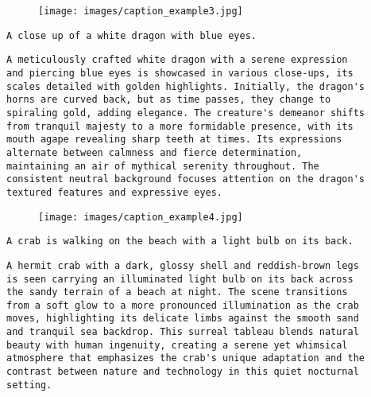 \documentclass{article} \usepackage{iclr2024_conference,times}
\begin{document}
{\begin{figure}[h]
\begin{center}
\texttt{[image: images/caption\_example3.jpg]}
\end{center}
\end{figure} \begin{promptbox}
\begin{verbatim}
A close up of a white dragon with blue eyes.
\end{verbatim}
\end{promptbox}
\begin{promptbox}
\begin{verbatim}
A meticulously crafted white dragon with a serene expression 
and piercing blue eyes is showcased in various close-ups, its 
scales detailed with golden highlights. Initially, the dragon's
horns are curved back, but as time passes, they change to 
spiraling gold, adding elegance. The creature's demeanor shifts 
from tranquil majesty to a more formidable presence, with its 
mouth agape revealing sharp teeth at times. Its expressions 
alternate between calmness and fierce determination, 
maintaining an air of mythical serenity throughout. The 
consistent neutral background focuses attention on the dragon's
textured features and expressive eyes.
\end{verbatim}
\end{promptbox}


\begin{figure}[h]
\begin{center}
\texttt{[image: images/caption\_example4.jpg]}
\end{center}
\end{figure} \begin{promptbox}
\begin{verbatim}
A crab is walking on the beach with a light bulb on its back.
\end{verbatim}
\end{promptbox}
\begin{promptbox}
\begin{verbatim}
A hermit crab with a dark, glossy shell and reddish-brown legs
is seen carrying an illuminated light bulb on its back across 
the sandy terrain of a beach at night. The scene transitions 
from a soft glow to a more pronounced illumination as the crab
moves, highlighting its delicate limbs against the smooth sand
and tranquil sea backdrop. This surreal tableau blends natural
beauty with human ingenuity, creating a serene yet whimsical 
atmosphere that emphasizes the crab's unique adaptation and the
contrast between nature and technology in this quiet nocturnal
setting.
\end{verbatim}
\end{promptbox}


}
\end{document}
